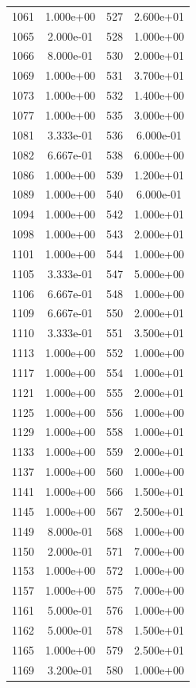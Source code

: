 \documentclass[12pt]{article}
\begin{document}
\begin{longtable}{@{}cccc@{}}
1061 & 1.000e+00 & 527 & 2.600e+01 \\
1065 & 2.000e-01 & 528 & 1.000e+00 \\
1066 & 8.000e-01 & 530 & 2.000e+01 \\
1069 & 1.000e+00 & 531 & 3.700e+01 \\
1073 & 1.000e+00 & 532 & 1.400e+00 \\
1077 & 1.000e+00 & 535 & 3.000e+00 \\
1081 & 3.333e-01 & 536 & 6.000e-01 \\
1082 & 6.667e-01 & 538 & 6.000e+00 \\
1086 & 1.000e+00 & 539 & 1.200e+01 \\
1089 & 1.000e+00 & 540 & 6.000e-01 \\
1094 & 1.000e+00 & 542 & 1.000e+01 \\
1098 & 1.000e+00 & 543 & 2.000e+01 \\
1101 & 1.000e+00 & 544 & 1.000e+00 \\
1105 & 3.333e-01 & 547 & 5.000e+00 \\
1106 & 6.667e-01 & 548 & 1.000e+00 \\
1109 & 6.667e-01 & 550 & 2.000e+01 \\
1110 & 3.333e-01 & 551 & 3.500e+01 \\
1113 & 1.000e+00 & 552 & 1.000e+00 \\
1117 & 1.000e+00 & 554 & 1.000e+01 \\
1121 & 1.000e+00 & 555 & 2.000e+01 \\
1125 & 1.000e+00 & 556 & 1.000e+00 \\
1129 & 1.000e+00 & 558 & 1.000e+01 \\
1133 & 1.000e+00 & 559 & 2.000e+01 \\
1137 & 1.000e+00 & 560 & 1.000e+00 \\
1141 & 1.000e+00 & 566 & 1.500e+01 \\
1145 & 1.000e+00 & 567 & 2.500e+01 \\
1149 & 8.000e-01 & 568 & 1.000e+00 \\
1150 & 2.000e-01 & 571 & 7.000e+00 \\
1153 & 1.000e+00 & 572 & 1.000e+00 \\
1157 & 1.000e+00 & 575 & 7.000e+00 \\
1161 & 5.000e-01 & 576 & 1.000e+00 \\
1162 & 5.000e-01 & 578 & 1.500e+01 \\
1165 & 1.000e+00 & 579 & 2.500e+01 \\
1169 & 3.200e-01 & 580 & 1.000e+00 \\

\end{longtable}
\end{document}
